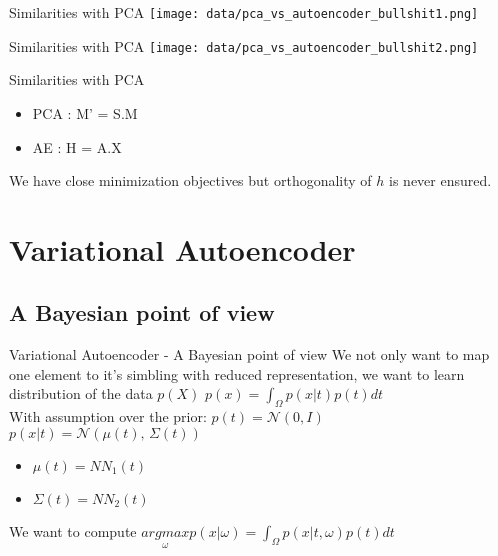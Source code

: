 \documentclass{beamer}
\begin{document}
\begin{frame}{Similarities with PCA}
    \texttt{[image: data/pca\_vs\_autoencoder\_bullshit1.png]}
\end{frame}

\begin{frame}{Similarities with PCA}
    \texttt{[image: data/pca\_vs\_autoencoder\_bullshit2.png]}
\end{frame}

\begin{frame}{Similarities with PCA}
	\begin{itemize}
		\item PCA : M' = S.M  
		\item AE : H = A.X
	\end{itemize}
We have close minimization objectives but orthogonality of $h$ is never ensured.
%
\end{frame}

\section{Variational Autoencoder}
\subsection{A Bayesian point of view}
\begin{frame}{Variational Autoencoder - A Bayesian point of view}
	We not only want to map one element to it's simbling with reduced representation, we want to learn distribution of the data $p(X)$
	$ p(x) = \int_\Omega p(x|t)p(t) dt$  \\
	With assumption over the prior: $p(t) = \mathcal{N}(0, I)$ \\
	$ p(x| t) = \mathcal{N}(\mu(t),\,\Sigma(t))$ \\
	\begin{itemize}
		\item $ \mu(t) = NN_1(t)$
		\item $ \Sigma(t) = NN_2(t)$
	\end{itemize}
	We want to compute $\underset{\omega}{argmax} p(x| \omega) = \int_\Omega p(x|t, \omega)p(t) dt$  \\
\end{frame}
\end{document}
